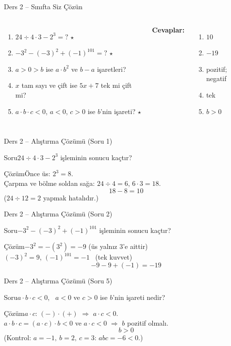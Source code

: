 \documentclass[aspectratio=169,11pt]{beamer}
\newcommand{\soru}[3]{%
\begin{frame}{#1}
  \begin{block}{Soru}\large #2\end{block}
  \pause
  \begin{exampleblock}{Çözüm}\large #3\end{exampleblock}
\end{frame}}
\begin{document}
\begin{frame}{Ders 2 -- Sınıfta Siz Çözün}
\begin{columns}[t]
\begin{enumerate}
\item \(24\div 4\cdot 3-2^3=?\) \(\star\)
\item \(-3^2-(-3)^2+(-1)^{101}=?\) \(\star\)
\item \(a>0>b\) ise \(a\cdot b^2\) ve \(b-a\) işaretleri?
\item \(x\) tam sayı ve çift ise \(5x+7\) tek mi çift mi?
\item \(a\cdot b\cdot c<0\), \(a<0\), \(c>0\) ise \(b\)'nin işareti? \(\star\)
\end{enumerate}
\pause
\textbf{Cevaplar:}
\begin{enumerate}
\item \(10\)
\item \(-19\)
\item pozitif; negatif
\item tek
\item \(b>0\)
\end{enumerate}
\end{columns}
\vspace{4pt}{\footnotesize \(\star\) işaretli soruların adım adım çözümü sonraki slaytlardadır.}
\end{frame}

\soru{Ders 2 -- Alıştırma Çözümü (Soru 1)}
{\(24\div 4\cdot 3-2^3\) işleminin sonucu kaçtır?}
{Önce üs: \(2^3=8\).\\[3pt]
Çarpma ve bölme soldan sağa: \(24\div 4=6\), \quad \(6\cdot 3=18\).
\[18-8=10\]
(\(24\div 12=2\) yapmak hatalıdır.)}

\soru{Ders 2 -- Alıştırma Çözümü (Soru 2)}
{\(-3^2-(-3)^2+(-1)^{101}\) işleminin sonucu kaçtır?}
{\(-3^2=-(3^2)=-9\) \quad (üs yalnız \(3\)'e aittir)\\[3pt]
\((-3)^2=9\), \quad \((-1)^{101}=-1\) \ (tek kuvvet)
\[-9-9+(-1)=-19\]}

\soru{Ders 2 -- Alıştırma Çözümü (Soru 5)}
{\(a\cdot b\cdot c<0\), \ \(a<0\) ve \(c>0\) ise \(b\)'nin işareti nedir?}
{\(a\cdot c\): \((-)\cdot(+)\) \(\Rightarrow\) \(a\cdot c<0\).\\[3pt]
\(a\cdot b\cdot c=(a\cdot c)\cdot b<0\) ve \(a\cdot c<0\) \(\Rightarrow\) \(b\) pozitif olmalı.
\[b>0\]
(Kontrol: \(a=-1,\ b=2,\ c=3\): \(abc=-6<0\).)}

\end{document}
